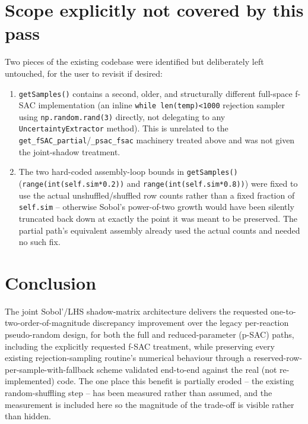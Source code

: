 \documentclass[11pt]{article}
\newcommand{\code}[1]{\texttt{#1}}
\begin{document}
\section{Scope explicitly not covered by this pass}

Two pieces of the existing codebase were identified but deliberately left untouched, for the user to revisit if desired:

\begin{enumerate}
\item \code{getSamples()} contains a second, older, and structurally different full-space f-SAC implementation (an inline \code{while len(temp)<1000} rejection sampler using \code{np.random.rand(3)} directly, not delegating to any \code{UncertaintyExtractor} method). This is unrelated to the \code{get\_fSAC\_partial}/\code{\_psac\_fsac} machinery treated above and was not given the joint-shadow treatment.
\item The two hard-coded assembly-loop bounds in \code{getSamples()} (\code{range(int(self.sim*0.2))} and \code{range(int(self.sim*0.8))}) were fixed to use the actual unshuffled/shuffled row counts rather than a fixed fraction of \code{self.sim} -- otherwise Sobol's power-of-two growth would have been silently truncated back down at exactly the point it was meant to be preserved. The partial path's equivalent assembly already used the actual counts and needed no such fix.
\end{enumerate}

\section{Conclusion}

The joint Sobol'/LHS shadow-matrix architecture delivers the requested one-to-two-order-of-magnitude discrepancy improvement over the legacy per-reaction pseudo-random design, for both the full and reduced-parameter (p-SAC) paths, including the explicitly requested f-SAC treatment, while preserving every existing rejection-sampling routine's numerical behaviour through a reserved-row-per-sample-with-fallback scheme validated end-to-end against the real (not re-implemented) code. The one place this benefit is partially eroded -- the existing random-shuffling step -- has been measured rather than assumed, and the measurement is included here so the magnitude of the trade-off is visible rather than hidden.
\end{document}
